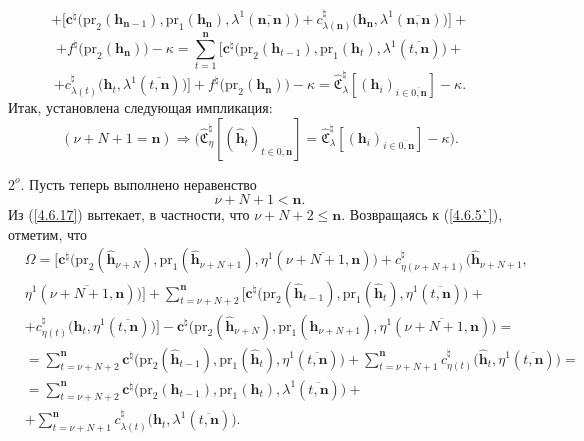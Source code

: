 \documentclass[11pt,twoside,openany]{report}
\newcommand{\bfn}{\begin{equation}}
\newcommand{\efn}{\end{equation}}
\newcommand{\ov}{\overline}
\newcommand{\Om}{\Omega}
\newcommand{\la}{\lambda}
\newcommand{\zc}{{\mathbf c}}
\newcommand{\nn}{{\mathbf n}}
\begin{document}
{{$$$$
$$
+\bigl[\zc^\natural\bigl(\mathrm{pr}_2(\mathbf{h}_{\nn-1}),\mathrm{pr}_1(\mathbf{h}_\nn),\la^1(\ov{\nn,\nn})
\bigl)+c_{\la(\nn)}^\natural\bigl(\mathbf{h}_\nn,\la^1(\ov{\nn,\nn})\bigl)\bigl] +
$$
$$
+f^\natural\bigl(\mathrm{pr}_2(\mathbf{h}_\nn)\bigl) -\kappa =
\sum\limits_{t=1}^\nn\bigl[\zc^\natural\bigl(\mathrm{pr}_2(\mathbf{h}_{t-1}),\mathrm{pr}_1
(\mathbf{h}_t),\la^1(\ov{t,\nn})\bigl)+
$$
$$+ c_{\la(t)}^\natural\bigl(\mathbf{h}_t,\la^1(\ov{t,\nn})\bigl)\bigl] +
f^\natural\bigl(\mathrm{pr}_2(\mathbf{h}_\nn)\bigl) -\kappa =
\widehat{\mathfrak{C}}_\lambda^\natural[(\mathbf{h}_i)_{i\in\ov{0,\nn}}]-\kappa.
$$
Итак, установлена следующая импликация:
\bfn\label{4.6.16}
(\nu+N+1 =\nn)\Longrightarrow \bigl(\widehat{\mathfrak{C}}_\eta^\natural[(\hat{\mathbf{h}}_t)_{t\in\ov{0,\nn}}]=
\widehat{\mathfrak{C}}_\la^\natural[(\mathbf{h}_i)_{i\in\ov{0,\nn}}]-\kappa\bigl).
\efn

$2^o.$ Пусть теперь выполнено неравенство
\bfn\label{4.6.17}\nu+N+1 < \nn.
\efn
Из (\ref{4.6.17}) вытекает, в частности, что $\nu+N+2 \leqslant \nn.$ Возвращаясь к (\ref{4.6.5`}), отметим, что
\begin{eqnarray}
&\Om = \bigl[\zc^\natural\bigl(\mathrm{pr}_2(\hat{\mathbf{h}}_{\nu+N}),\mathrm{pr}_1(\hat{\mathbf{h}}_{\nu+N+1}),
 \eta^1(\ov{\nu+N+1,\nn})\bigl) + c_{\eta(\nu+N+1)}^\natural\bigl(\hat{\mathbf{h}}_{\nu+N+1},
&\nonumber\\
&\eta^1(\ov{\nu+N+1,\nn})\bigl)\bigl] + \sum\limits_{t=\nu+N+2}^\nn\bigl[
\zc^\natural\bigl(\mathrm{pr}_2(\hat{\mathbf{h}}_{t-1}),\mathrm{pr}_1(\hat{\mathbf{h}}_t),
 \eta^1(\ov{t,\nn})\bigl) +
&\nonumber\\
&+ c_{\eta(t)}^\natural\bigl(\hat{\mathbf{h}}_t,\eta^1(\ov{t,\nn})\bigl)\bigl]-
\zc^\natural\bigl(\mathrm{pr}_2(\hat{\mathbf{h}}_{\nu+N}),\mathrm{pr}_1(\hat{\mathbf{h}}_{\nu+N+1}),
\eta^1(\ov{\nu+N+1,\nn})\bigl) =
&\nonumber\\
&= \sum\limits_{t=\nu+N+2}^\nn    \zc^\natural\bigl(\mathrm{pr}_2(\hat{\mathbf{h}}_{t-1}),
\mathrm{pr}_1(\hat{\mathbf{h}}_t),
\eta^1(\ov{t,\nn})\bigl) + \sum\limits_{t=\nu+N+1}^\nn c_{\eta(t)}^\natural\bigl(\hat{\mathbf{h}}_t,
\eta^1(\ov{t,\nn})\bigl) =
&\nonumber\\
&=  \sum\limits_{t=\nu+N+2}^\nn    \zc^\natural\bigl(\mathrm{pr}_2(\mathbf{h}_{t-1}),\mathrm{pr}_1(\mathbf{h}_t),
 \la^1(\ov{t,\nn})\bigl) +
&\nonumber\\
&+\sum\limits_{t=\nu+N+1}^\nn c_{\la(t)}^\natural\bigl(\mathbf{h}_t, \la^1(\ov{t,\nn})\bigl).
&\label{4.6.18}
\end{eqnarray}

}}
\end{document}
